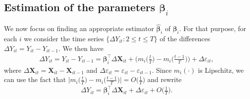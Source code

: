 \documentclass[a4paper,12pt]{article}
\begin{document}

\subsection{Estimation of the parameters $\bm{\beta}_i$}\label{subsec-test-est}

We now focus on finding an appropriate estimator $\widehat{\bm{\beta}}_i$ of $\bm{\beta}_i$. For that purpose, for each $i$ we consider the time series $\{\Delta Y_{it}: 2 \leq t \leq T\}$ of the differences $\Delta Y_{it} = Y_{it} - Y_{i t-1}$. We then have
\begin{align*}
	\Delta Y_{it} = Y_{it} - Y_{i t-1} =\bm{\beta}_i^\top \Delta \mathbf{X}_{it} + \bigg(m_i \Big( \frac{t}{T} \Big) - m_i \Big(\frac{t-1}{T}\Big)\bigg) + \Delta \varepsilon_{it},
\end{align*}
where $\Delta  \mathbf{X}_{it} =  \mathbf{X}_{it} -  \mathbf{X}_{it-1}$ and $ \Delta \varepsilon_{it} = \varepsilon_{it} - \varepsilon_{i t-1}$. Since $m_i(\cdot)$ is Lipschitz, we can use the fact that $ \big|m_i \big( \frac{t}{T} \big) - m_i \big(\frac{t-1}{T}\big) \big| = O\big(\frac{1}{T}\big)$ and rewrite 
\begin{align}\label{model_with_regs}
	\Delta Y_{it} = \bm{\beta}_i^\top \Delta \mathbf{X}_{it} + \Delta \varepsilon_{it} + O\Big(\frac{1}{T}\Big).
\end{align}
\end{document}
